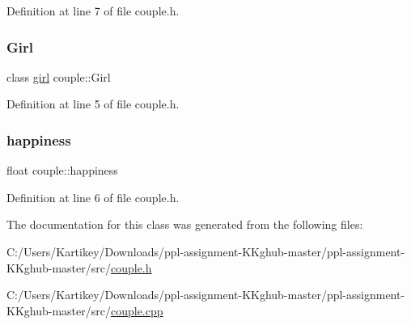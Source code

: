 Definition at line 7 of file couple.\+h.

\mbox{\label{classcouple_a2ac499f5e234d65671e5734f6503a8e9}} 
\subsubsection{\texorpdfstring{Girl}{Girl}}
{\footnotesize\ttfamily class \hyperlink{classgirl}{girl} couple\+::\+Girl}



Definition at line 5 of file couple.\+h.

\mbox{\label{classcouple_a36ac5ab91759c51c757fd0159a45a7b2}} 
\subsubsection{\texorpdfstring{happiness}{happiness}}
{\footnotesize\ttfamily float couple\+::happiness}



Definition at line 6 of file couple.\+h.



The documentation for this class was generated from the following files\+:\begin{DoxyCompactItemize}
\item 
C\+:/\+Users/\+Kartikey/\+Downloads/ppl-\/assignment-\/\+K\+Kghub-\/master/ppl-\/assignment-\/\+K\+Kghub-\/master/src/\hyperlink{couple_8h}{couple.\+h}\item 
C\+:/\+Users/\+Kartikey/\+Downloads/ppl-\/assignment-\/\+K\+Kghub-\/master/ppl-\/assignment-\/\+K\+Kghub-\/master/src/\hyperlink{couple_8cpp}{couple.\+cpp}\end{DoxyCompactItemize}
